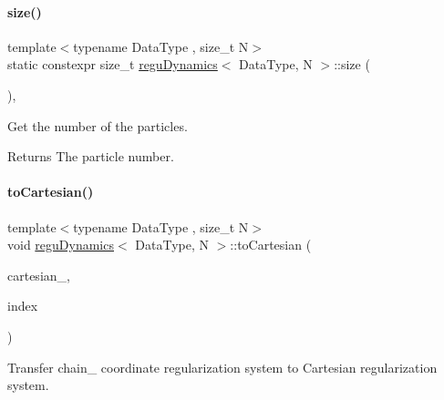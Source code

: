 \paragraph{\texorpdfstring{size()}{size()}}
{\footnotesize\ttfamily template$<$typename Data\+Type , size\+\_\+t N$>$ \\
static constexpr size\+\_\+t \mbox{\hyperlink{classregu_dynamics}{regu\+Dynamics}}$<$ Data\+Type, N $>$\+::size (\begin{DoxyParamCaption}{ }\end{DoxyParamCaption})\hspace{0.3cm}{\ttfamily [inline]}, {\ttfamily [static]}}



Get the number of the particles. 

\begin{DoxyReturn}{Returns}
The particle number. 
\end{DoxyReturn}
\mbox{\label{classregu_dynamics_a3dd8d377588308a02396ca6d06945859}} 
\paragraph{\texorpdfstring{to\+Cartesian()}{toCartesian()}}
{\footnotesize\ttfamily template$<$typename Data\+Type , size\+\_\+t N$>$ \\
void \mbox{\hyperlink{classregu_dynamics}{regu\+Dynamics}}$<$ Data\+Type, N $>$\+::to\+Cartesian (\begin{DoxyParamCaption}\item[{\mbox{\hyperlink{classregu_dynamics}{regu\+Dynamics}}$<$ Data\+Type, N $>$ \&}]{cartesian_,  }\item[{\mbox{\hyperlink{classregu_dynamics_a2c9fa7372e4a11be9d85728b4a0e455f}{Index\+Array}} \&}]{index }\end{DoxyParamCaption})\hspace{0.3cm}{\ttfamily [inline]}}



Transfer chain_ coordinate regularization system to Cartesian regularization system.

